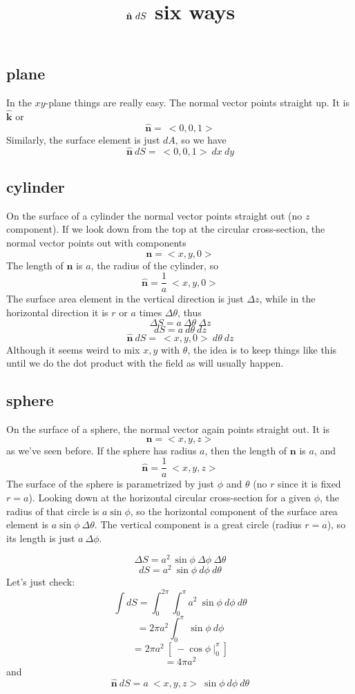 \documentclass[11pt, oneside]{article}   	%
\title{$\hat{\bf{n}} \ dS$ six ways}
\date{}							%
\begin{document}
\maketitle
\Large

\subsection*{plane}
In the $xy$-plane things are really easy.  The normal vector points straight up.  It is $\hat{\mathbf{k}}$ or
\[ \hat{\mathbf{n}} = \ <0,0,1> \]
Similarly, the surface element is just $dA$, so we have
\[ \hat{\mathbf{n}} \ dS = \ <0,0,1>  \ dx \ dy \]

\subsection*{cylinder}
On the surface of a cylinder the normal vector points straight out (no $z$ component).  If we look down from the top at the circular cross-section, the normal vector points out with components 
\[ \mathbf{n} = <x,y,0> \]
The length of $\mathbf{n}$ is $a$, the radius of the cylinder, so
\[ \hat{\mathbf{n}} = \frac{1}{a} \ <x,y,0> \]
The surface area element in the vertical direction is just $\Delta z$, while in the horizontal direction it is $r$ or $a$ times $\Delta \theta$, thus 
\[ \Delta S = a \ \Delta \theta \ \Delta z \]
\[ dS = a \ d \theta \ dz \]
\[ \hat{\mathbf{n}} \ dS = \ <x,y,0>  \ d \theta \ dz \]
Although it seems weird to mix $x,y$ with $\theta$, the idea is to keep things like this until we do the dot product with the field as will usually happen.

\subsection*{sphere}
On the surface of a sphere, the normal vector again points straight out.  It is
\[ \mathbf{n} = <x,y,z> \]
as we've seen before.  If the sphere has radius $a$, then the length of $\mathbf{n}$ is $a$, and
\[ \hat{\mathbf{n}} = \frac{1}{a} \ <x,y,z> \]
The surface of the sphere is parametrized by just $\phi$ and $\theta$ (no $r$ since it is fixed $r=a$).  Looking down at the horizontal circular cross-section for a given $\phi$, the radius of that circle is $a \sin \phi$, so the horizontal component of the surface area element is $a \sin \phi \ \Delta \theta$.  The vertical component is a great circle (radius $r = a$), so its length is just $a \ \Delta \phi$.

\[ \Delta S = a^2 \ \sin \phi \ \Delta \phi \ \Delta \theta \]
\[ dS = a^2 \ \sin \phi \ d \phi \ d \theta \]
Let's just check:
\[ \int dS = \int_0^{2 \pi} \int_0^{\pi} a^2 \ \sin \phi \ d \phi \ d \theta \]
\[ = 2 \pi a^2  \int_0^{\pi} \ \sin \phi \ d \phi \]
\[ = 2 \pi a^2 \ [ \ - \cos \phi  \ \bigg |_0^{\pi} \ ] \]
\[ = 4 \pi a^2 \]
and
\[ \hat{\mathbf{n}} \ dS = a \ <x,y,z>   \ \sin \phi \ d \phi \ d \theta \]
\end{document}
